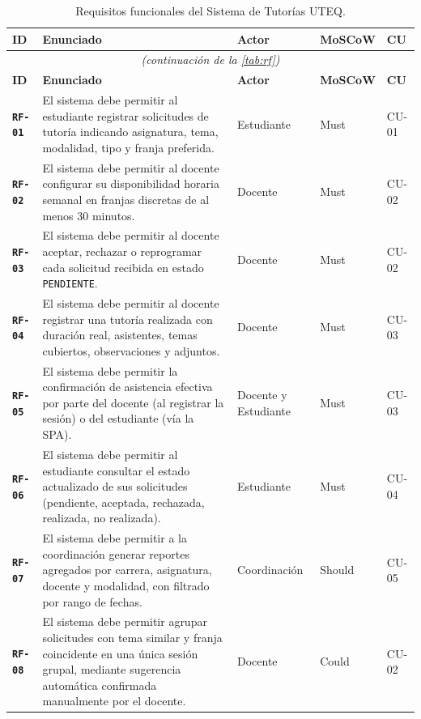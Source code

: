 \documentclass[11pt,a4paper,twoside]{report}
\newcommand{\reqid}[1]{\texttt{\textbf{#1}}}
\begin{document}
\begin{longtable}{@{}p{1.2cm}p{7.5cm}p{2.5cm}p{1.3cm}p{1.5cm}@{}}
    \caption{Requisitos funcionales del Sistema de Tutor\'ias UTEQ.}
    \label{tab:rf}\\
    \toprule
    \textbf{ID} & \textbf{Enunciado} & \textbf{Actor} & \textbf{MoSCoW} & \textbf{CU} \\
    \midrule
    \endfirsthead
    \multicolumn{5}{c}{\itshape (continuaci\'on de la \cref{tab:rf})}\\
    \toprule
    \textbf{ID} & \textbf{Enunciado} & \textbf{Actor} & \textbf{MoSCoW} & \textbf{CU} \\
    \midrule
    \endhead

    \reqid{RF-01}\label{rf:01} & El sistema debe permitir al estudiante registrar solicitudes de tutor\'ia indicando asignatura, tema, modalidad, tipo y franja preferida. & Estudiante & Must & CU-01 \\
    \reqid{RF-02}\label{rf:02} & El sistema debe permitir al docente configurar su disponibilidad horaria semanal en franjas discretas de al menos 30 minutos. & Docente & Must & CU-02 \\
    \reqid{RF-03}\label{rf:03} & El sistema debe permitir al docente aceptar, rechazar o reprogramar cada solicitud recibida en estado \texttt{PENDIENTE}. & Docente & Must & CU-02 \\
    \reqid{RF-04}\label{rf:04} & El sistema debe permitir al docente registrar una tutor\'ia realizada con duraci\'on real, asistentes, temas cubiertos, observaciones y adjuntos. & Docente & Must & CU-03 \\
    \reqid{RF-05}\label{rf:05} & El sistema debe permitir la confirmaci\'on de asistencia efectiva por parte del docente (al registrar la sesi\'on) o del estudiante (v\'ia la SPA). & Docente y Estudiante & Must & CU-03 \\
    \reqid{RF-06}\label{rf:06} & El sistema debe permitir al estudiante consultar el estado actualizado de sus solicitudes (pendiente, aceptada, rechazada, realizada, no realizada). & Estudiante & Must & CU-04 \\
    \reqid{RF-07}\label{rf:07} & El sistema debe permitir a la coordinaci\'on generar reportes agregados por carrera, asignatura, docente y modalidad, con filtrado por rango de fechas. & Coordinaci\'on & Should & CU-05 \\
    \reqid{RF-08}\label{rf:08} & El sistema debe permitir agrupar solicitudes con tema similar y franja coincidente en una \'unica sesi\'on grupal, mediante sugerencia autom\'atica confirmada manualmente por el docente. & Docente & Could & CU-02 \\

\end{longtable}
\end{document}
